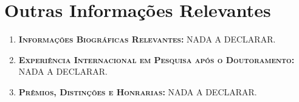 \section{Outras Informações Relevantes}
\begin{enumerate}[label=\arabic{section}.\alph*), format=\bfseries, itemsep=0.5\baselineskip, topsep=0.5\baselineskip]
	\item \textsc{\bfseries Informações Biográficas Relevantes:}
	NADA A DECLARAR.

	\item \textsc{\bfseries Experiência Internacional em Pesquisa após o Doutoramento:}
	NADA A DECLARAR.

	\item \textsc{\bfseries Prêmios, Distinções e Honrarias:}
	NADA A DECLARAR.
\end{enumerate}
